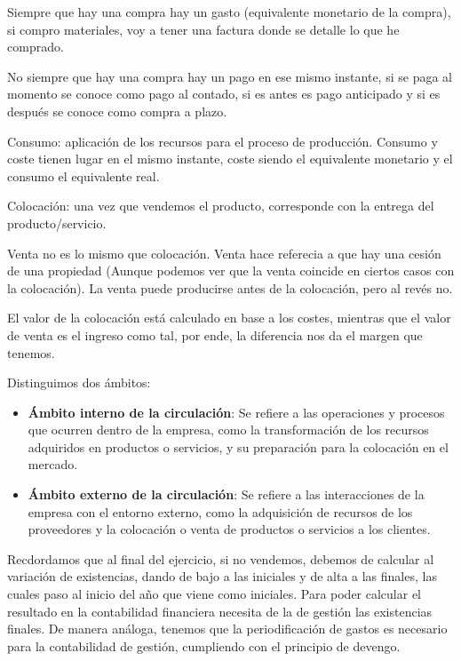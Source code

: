 \documentclass[12pt]{book} %
\begin{document}

Siempre que hay una compra hay un gasto (equivalente monetario de la
compra), si compro materiales, voy a tener una factura donde se detalle
lo que he comprado.

No siempre que hay una compra hay un pago en ese mismo instante, si se
paga al momento se conoce como pago al contado, si es antes es pago
anticipado y si es después se conoce como compra a plazo.

Consumo: aplicación de los recursos para el proceso de producción.
Consumo y coste tienen lugar en el mismo instante, coste siendo el
equivalente monetario y el consumo el equivalente real.

Colocación: una vez que vendemos el producto, corresponde con la entrega
del producto/servicio.

Venta no es lo mismo que colocación. Venta hace referecia a que hay una
cesión de una propiedad (Aunque podemos ver que la venta coincide en
ciertos casos con la colocación). La venta puede producirse antes de la
colocación, pero al revés no.

El valor de la colocación está calculado en base a los costes, mientras
que el valor de venta es el ingreso como tal, por ende, la diferencia
nos da el margen que tenemos.

Distinguimos dos ámbitos:

\begin{itemize}
\item
  \textbf{Ámbito interno de la circulación}: Se refiere a las
  operaciones y procesos que ocurren dentro de la empresa, como la
  transformación de los recursos adquiridos en productos o servicios, y
  su preparación para la colocación en el mercado.
\item
  \textbf{Ámbito externo de la circulación}: Se refiere a las
  interacciones de la empresa con el entorno externo, como la
  adquisición de recursos de los proveedores y la colocación o venta de
  productos o servicios a los clientes.
\end{itemize}

Recdordamos que al final del ejercicio, si no vendemos, debemos de
calcular al variación de existencias, dando de bajo a las iniciales y de
alta a las finales, las cuales paso al inicio del año que viene como
iniciales. Para poder calcular el resultado en la contabilidad
financiera necesita de la de gestión las existencias finales. De manera
análoga, tenemos que la periodificación de gastos es necesario para la
contabilidad de gestión, cumpliendo con el principio de devengo.
\end{document}
